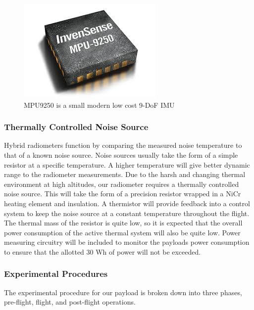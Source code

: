 \documentclass[12pt]{article}
\begin{document}
\begin{figure}[h!]
	\centering
	\includegraphics[width=.4\linewidth]{Figures/IMU.jpg}
	\caption{MPU9250 is a small modern low cost 9-DoF IMU}
	\label{fig:imu}
\end{figure}

\subsubsection{Thermally Controlled Noise Source}

Hybrid radiometers function by comparing the measured noise temperature to that of a known noise source. Noise sources usually take the form of a simple resistor at a specific temperature. A higher temperature will give better dynamic range to the radiometer measurements. Due to the harsh and changing thermal environment at high altitudes, our radiometer requires a thermally controlled noise source. This will take the form of a precision resistor wrapped in a NiCr heating element and insulation. A thermistor will provide feedback into a control system to keep the noise source at a constant temperature throughout the flight. The thermal mass of the resistor is quite low, so it is expected that the overall power consumption of the active thermal system will also be quite low. Power measuring circuitry will be included to monitor the payloads power consumption to ensure that the allotted 30 Wh of power will not be exceeded.

\subsubsection{Experimental Procedures}

The experimental procedure for our payload is broken down into three phases, pre-flight, flight, and post-flight operations.
\end{document}
